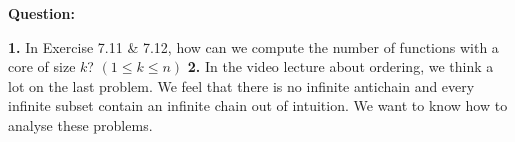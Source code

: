 \documentclass{article} %
\begin{document}
	\textbf{Question:}\par
	\textbf{1.}  In Exercise 7.11 \& 7.12, how can we compute the number of functions with a core of size $k$? $(1\leq k\leq n)$
	\textbf{2.}  In the video lecture about ordering, we think a lot on the last problem. We feel that there is no infinite antichain and every infinite subset contain an infinite chain out of intuition. We want to know how to analyse these problems.
\end{document}
